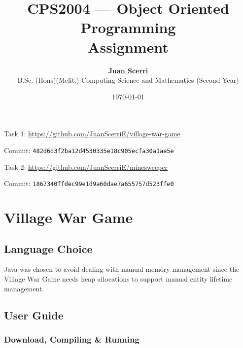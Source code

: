 \documentclass[12pt]{article}
\title{CPS2004 --- Object Oriented Programming\\
\vspace{1em}\textbf{Assignment}}
\date{\today}
\author {{\textbf{Juan Scerri}}\\
B.Sc. (Hons)(Melit.) Computing Science and Mathematics (Second Year)}
\begin{document}

\maketitle %

\thispagestyle{empty} %

\begin{center}
    Task 1: \url{https://github.com/JuanScerriE/village-war-game}
\end{center}
\vspace{-2.4em}
\begin{center}
    Commit: \texttt{482d6d3f2ba12d4530335e18c905ecfa30a1ae5e}
\end{center}
\begin{center}
    Task 2: \url{https://github.com/JuanScerriE/minesweeper}
\end{center}
\vspace{-2.4em}
\begin{center}
    Commit: \texttt{1867340ffdec99e1d9a60dae7a655757d523ffe0}
\end{center}

\tableofcontents

\listoffigures


\section{Village War Game}

\subsection{Language Choice}

Java was chosen to avoid dealing with manual memory management
since the Village War Game needs heap allocations to support
manual entity lifetime management.

\subsection{User Guide}

\subsubsection{Download, Compiling \& Running}
\end{document}
